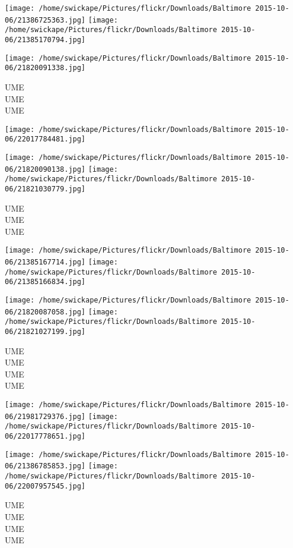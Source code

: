\documentclass[10pt,letterpaper]{article}
\begin{document}
\texttt{[image: /home/swickape/Pictures/flickr/Downloads/Baltimore 2015-10-06/21386725363.jpg]}
\texttt{[image: /home/swickape/Pictures/flickr/Downloads/Baltimore 2015-10-06/21385170794.jpg]}

\texttt{[image: /home/swickape/Pictures/flickr/Downloads/Baltimore 2015-10-06/21820091338.jpg]}

UME\\
UME\\
UME
\pagebreak

\texttt{[image: /home/swickape/Pictures/flickr/Downloads/Baltimore 2015-10-06/22017784481.jpg]}

\vspace{0.25in}
\texttt{[image: /home/swickape/Pictures/flickr/Downloads/Baltimore 2015-10-06/21820090138.jpg]}
\texttt{[image: /home/swickape/Pictures/flickr/Downloads/Baltimore 2015-10-06/21821030779.jpg]}

UME\\
UME\\
UME
\pagebreak

\texttt{[image: /home/swickape/Pictures/flickr/Downloads/Baltimore 2015-10-06/21385167714.jpg]}
\texttt{[image: /home/swickape/Pictures/flickr/Downloads/Baltimore 2015-10-06/21385166834.jpg]}

\texttt{[image: /home/swickape/Pictures/flickr/Downloads/Baltimore 2015-10-06/21820087058.jpg]}
\texttt{[image: /home/swickape/Pictures/flickr/Downloads/Baltimore 2015-10-06/21821027199.jpg]}

UME\\
UME\\
UME\\
UME
\pagebreak

\texttt{[image: /home/swickape/Pictures/flickr/Downloads/Baltimore 2015-10-06/21981729376.jpg]}
\texttt{[image: /home/swickape/Pictures/flickr/Downloads/Baltimore 2015-10-06/22017778651.jpg]}

\texttt{[image: /home/swickape/Pictures/flickr/Downloads/Baltimore 2015-10-06/21386785853.jpg]}
\texttt{[image: /home/swickape/Pictures/flickr/Downloads/Baltimore 2015-10-06/22007957545.jpg]}

UME\\
UME\\
UME\\
UME
\pagebreak
\end{document}
